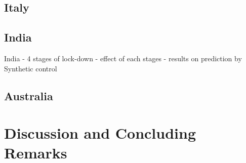\documentclass[preprint,authoryear,12pt]{elsarticle}
\begin{document}
	\subsection{Italy}
	
	\subsection{India}
	India - 4 stages of lock-down - effect of each stages - results on prediction by Synthetic control
	
	\subsection{Australia}

	
	\section{Discussion and Concluding Remarks}
	\label{SEC4}
	
	
	
		
\end{document}

